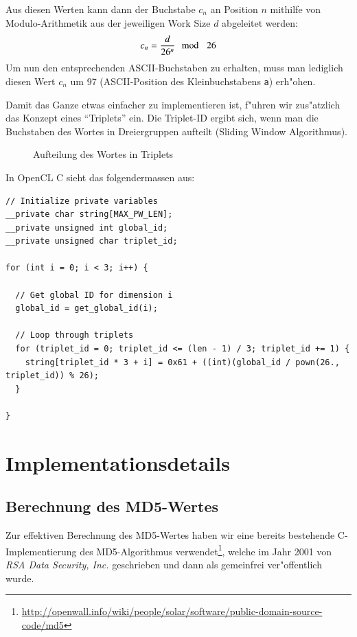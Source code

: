 \begin{refsection}
\noindent Aus diesen Werten kann dann der Buchstabe $c_n$ an Position $n$ mithilfe von
Modulo-Arithmetik aus der jeweiligen Work Size $d$ abgeleitet werden:
\[
	c_n = \frac{d}{26^n} \mod\enskip 26
\]
Um nun den entsprechenden ASCII-Buchstaben zu erhalten, muss man lediglich
diesen Wert $c_n$ um 97 (ASCII-Position des Kleinbuchstabens \texttt{a})
erh"ohen.

Damit das Ganze etwas einfacher zu implementieren ist, f"uhren wir zus"atzlich
das Konzept eines ``Triplets'' ein. Die Triplet-ID ergibt sich, wenn man die
Buchstaben des Wortes in Dreiergruppen aufteilt (Sliding Window Algorithmus).

\begin{figure}[H]
	\centering
	
	\caption{Aufteilung des Wortes in Triplets}
	\label{img:crypto:triplets}
\end{figure}

\noindent In OpenCL C sieht das folgendermassen aus:

\begin{small}
\begin{verbatim}
// Initialize private variables
__private char string[MAX_PW_LEN];
__private unsigned int global_id;
__private unsigned char triplet_id;

for (int i = 0; i < 3; i++) {

  // Get global ID for dimension i
  global_id = get_global_id(i);

  // Loop through triplets
  for (triplet_id = 0; triplet_id <= (len - 1) / 3; triplet_id += 1) {
    string[triplet_id * 3 + i] = 0x61 + ((int)(global_id / pown(26., triplet_id)) % 26);
  }

}
\end{verbatim}
\end{small}

\section{Implementationsdetails}

\subsection{Berechnung des MD5-Wertes}
\label{crypto:md5lib}

Zur effektiven Berechnung des MD5-Wertes haben wir eine bereits bestehende
C-Implementierung des MD5-Algorithmus
verwendet\footnote{\url{http://openwall.info/wiki/people/solar/software/public-domain-source-code/md5}},
welche im Jahr 2001 von \textit{RSA Data Security, Inc.} geschrieben und dann
als gemeinfrei ver"offentlich wurde.


\end{refsection}
